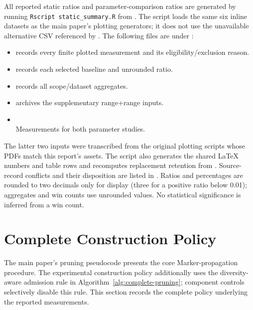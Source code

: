 All reported static ratios and parameter-comparison ratios are generated by running
\texttt{Rscript static\_summary.R} from .
The script loads the same six inline datasets as the main paper's plotting generators; it does not use the unavailable alternative CSV referenced by .
The following files are under :
\begin{itemize}
  \item {} records every finite plotted measurement and its eligibility/exclusion reason.
  \item {} records each selected baseline and unrounded ratio.
  \item {} records all scope/dataset aggregates.
  \item {} archives the supplementary range+range inputs.
  \item {}\\
  Measurements for both parameter studies.
\end{itemize}
The latter two inputs were transcribed from the original plotting scripts whose PDFs match this report's assets.
The script also generates the shared LaTeX numbers and table rows and recomputes replacement retention from .
Source-record conflicts and their disposition are listed in .
Ratios and percentages are rounded to two decimals only for display (three for a positive ratio below 0.01); aggregates and win counts use unrounded values.
No statistical significance is inferred from a win count.

\section{Complete Construction Policy}
\label{sec:complete-construction}

The main paper's pruning pseudocode presents the core Marker-propagation procedure.
The experimental construction policy additionally uses the diversity-aware admission rule in Algorithm~\ref{alg:complete-pruning}; component controls selectively disable this rule.
This section records the complete policy underlying the reported measurements.

